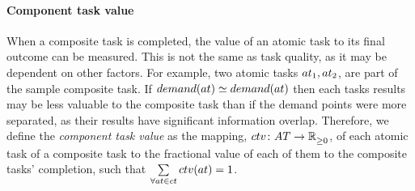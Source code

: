 \paragraph{Component task value}
\newcommand{\functionComponentTaskValue}[2]{
	\functionSignature{ctv}{\varAtomicTask{}{}}
}
\newcommand{\formalComponentTaskValue}[2]{
	\functionFormal{ctv}{\setAtomicTask{}{}}{\setRealNumbersNonNegative{}{}}
}

When a composite task is completed, the value of an atomic task to its final outcome can be measured. This is not the same as task quality, as it may be dependent on other factors. For example,  two atomic tasks $\varAtomicTask{1}{}, \varAtomicTask{2}{}$, are part of the sample composite task. If $\functionTaskDemandPoint{1}{} \simeq \functionTaskDemandPoint{2}{}$ then each tasks results may be less valuable to the composite task than if the demand points were more separated, as their results have significant information overlap. Therefore, we define the \textit{component task value} as the mapping, $\formalComponentTaskValue{}{}$,  of each atomic task of a composite task to the fractional value of each of them to the composite tasks' completion, such that $\sum\limits_{\forall \varAtomicTask{}{} \in \varCompositeTask{}{}} \functionComponentTaskValue{}{} = 1$.

